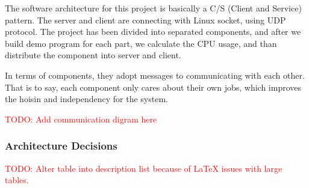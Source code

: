 \documentclass[11pt,a4paper,titlepage]{report}
\begin{document}
The software architecture for this project is basically a C/S (Client and Service) pattern. The server and client are connecting with Linux socket, using UDP protocol. The project has been divided into separated components, and after we build demo program for each part, we calculate the CPU usage, and than distribute the component into server and client.

In terms of components, they adopt messages to communicating with each other. That is to say, each component only cares about their own jobs, which improves the hoisin and independency for the system.

\textcolor{red}{TODO: Add communication digram here}


\subsubsection{Architecture Decisions}

\textcolor{red}{TODO: Alter table into description list because of LaTeX issues with large tables.}


%
%      
%
%
%
%      
%      
\end{document}

